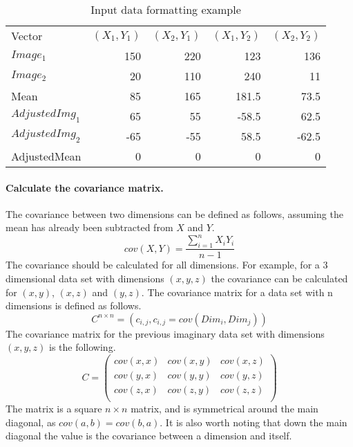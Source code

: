 \begin{table}[h!]
\centering
\begin{tabular}{l|rrrr}
\hline
\noalign{\smallskip}
Vector & $(X_1, Y_1)$ & $(X_2, Y_1)$ & $(X_1, Y_2)$ & $(X_2, Y_2)$\\
\noalign{\smallskip}
\hline
\noalign{\smallskip}
$Image_1$ & 150 & 220 & 123 & 136 \\
$Image_2$ & 20 & 110 & 240 & 11 \\
Mean & 85 & 165 & 181.5 & 73.5 \\
$AdjustedImg_1$ & 65  & 55 & -58.5 & 62.5 \\
$AdjustedImg_2$ & -65 & -55 & 58.5 & -62.5 \\
AdjustedMean & 0 & 0 & 0 & 0 \\
\hline
\end{tabular}
\caption{Input data formatting example}\label{tab:formattingexample}
\end{table}

\paragraph{Calculate the covariance matrix.}
The covariance between two dimensions can be defined as follows, assuming the mean has already been subtracted from $X$ and $Y$.
$$cov(X, Y) = \frac{\sum_{i=1}^{n} X_iY_i}{n-1}$$
The covariance should be calculated for all dimensions.
For example, for a 3 dimensional data set with dimensions $(x,y,z)$ the covariance can be calculated for $(x,y)$, $(x,z)$ and $(y,z)$.
The covariance matrix for a data set with n dimensions is defined as follows.
$$C^{n\times n} = (c_{i,j}, c_{i,j} = cov(Dim_i, Dim_j))$$
The covariance matrix for the previous imaginary data set with dimensions $(x,y,z)$ is the following.
$$
C= \begin{pmatrix}
cov(x,x) & cov(x,y) & cov(x,z) \\
cov(y,x) & cov(y,y) & cov(y,z) \\
cov(z,x) & cov(z,y) & cov(z,z) \\
\end{pmatrix}
$$
The matrix is a square $n\times n$ matrix, and is symmetrical around the main diagonal, as $cov(a,b) = cov(b,a)$.
It is also worth noting that down the main diagonal the value is the covariance between a dimension and itself.

